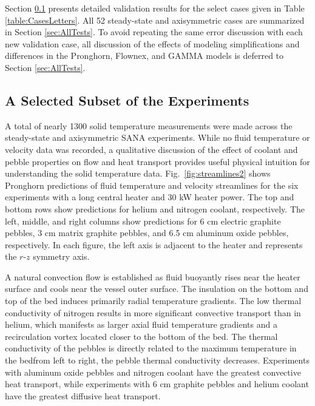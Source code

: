 Section \ref{sec:sana_subset} presents detailed validation results for the select cases given in Table \ref{table:CasesLetters}. All 52 steady-state and axisymmetric cases are summarized in Section \ref{sec:AllTests}. To avoid repeating the same error discussion with each new validation case, all discussion of the effects of modeling simplifications and differences in the Pronghorn, Flownex, and GAMMA models is deferred to Section \ref{sec:AllTests}.

\subsection{A Selected Subset of the Experiments}
\label{sec:sana_subset}

A total of nearly 1300 solid temperature measurements were made across the steady-state and axisymmetric SANA experiments. While no fluid temperature or velocity data was recorded, a qualitative discussion of the effect of coolant and pebble properties on flow and heat transport provides useful physical intuition for understanding the solid temperature data. Fig.\ \ref{fig:streamlines2} shows Pronghorn predictions of fluid temperature and velocity streamlines for the six experiments with a long central heater and 30 \si{\kilo\watt} heater power. The top and bottom rows show predictions for helium and nitrogen coolant, respectively. The left, middle, and right columns show predictions for 6 \si{\centi\meter} electric graphite pebbles, 3 \si{\centi\meter} matrix graphite pebbles, and 6.5 \si{\centi\meter} aluminum oxide pebbles, respectively. In each figure, the left axis is adjacent to the heater and represents the $r$-$z$ symmetry axis. 

A natural convection flow is established as fluid buoyantly rises near the heater surface and cools near the vessel outer surface. The insulation on the bottom and top of the bed induces primarily radial temperature gradients. The low thermal conductivity of nitrogen results in more significant convective transport than in helium, which manifests as larger axial fluid temperature gradients and a recirculation vortex located closer to the bottom of the bed. The thermal conductivity of the pebbles is directly related to the maximum temperature in the bed\mdash from left to right, the pebble thermal conductivity decreases. Experiments with aluminum oxide pebbles and nitrogen coolant have the greatest convective heat transport, while experiments with 6 \si{\centi\meter} graphite pebbles and helium coolant have the greatest diffusive heat transport. 

